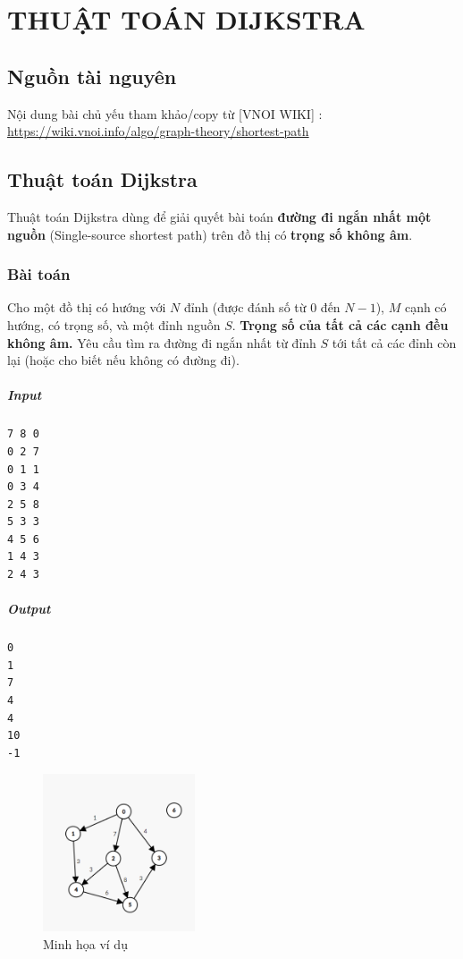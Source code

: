 \chapter{THUẬT TOÁN DIJKSTRA}

\minitoc

\section{Nguồn tài nguyên}

Nội dung bài chủ yếu tham khảo/copy từ [VNOI WIKI] : \url{https://wiki.vnoi.info/algo/graph-theory/shortest-path}

\section{Thuật toán Dijkstra}


Thuật toán Dijkstra dùng để giải quyết bài toán \textbf{đường đi ngắn nhất một nguồn} (Single-source shortest path) trên đồ thị có \textbf{trọng số không âm}.

\subsection{Bài toán}

Cho một đồ thị có hướng với $N$ đỉnh (được đánh số từ $0$ đến $N-1$), $M$ cạnh có hướng, có trọng số, và một đỉnh nguồn $S$. \textbf{Trọng số của tất cả các cạnh đều không âm.} Yêu cầu tìm ra đường đi ngắn nhất từ đỉnh $S$ tới tất cả các đỉnh còn lại (hoặc cho biết nếu không có đường đi).

\paragraph{Input}
\begin{lstlisting}
7 8 0
0 2 7
0 1 1
0 3 4
2 5 8
5 3 3
4 5 6
1 4 3
2 4 3
\end{lstlisting}
\paragraph{Output}
\begin{lstlisting}
0
1
7
4
4
10
-1
\end{lstlisting}

\begin{figure}[h]
    \centering
    \includegraphics[width=0.4\textwidth]{resource/img/b7/dijkstra_1.png}
    \caption{Minh họa ví dụ}
\end{figure}

